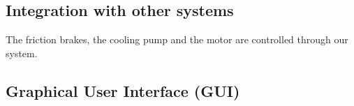 \subsection{Integration with other systems}
The friction brakes, the cooling pump and the motor are controlled through our system.

\subsection{Graphical User Interface (GUI)}

